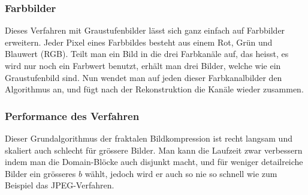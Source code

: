\subsubsection{Farbbilder}
Dieses Verfahren mit Graustufenbilder lässt sich ganz einfach auf Farbbilder erweitern.
Jeder Pixel eines Farbbildes besteht aus einem Rot, Grün und Blauwert (RGB).
Teilt man ein Bild in die drei Farbkanäle auf, das heisst, es wird nur noch ein Farbwert benutzt, erhält man drei Bilder, welche wie ein Graustufenbild sind.
Nun wendet man auf jeden dieser Farbkanalbilder den Algorithmus an, und fügt nach der Rekonstruktion die Kanäle wieder zusammen. 

\subsubsection{Performance des Verfahren}
Dieser Grundalgorithmus der fraktalen Bildkompression ist recht langsam und skaliert auch schlecht für grössere Bilder.
Man kann die Laufzeit zwar verbessern indem man die Domain-Blöcke auch disjunkt macht, und für weniger detailreiche Bilder ein grösseres $b$ wählt, jedoch wird er auch so nie so schnell wie zum Beispiel das JPEG-Verfahren.

